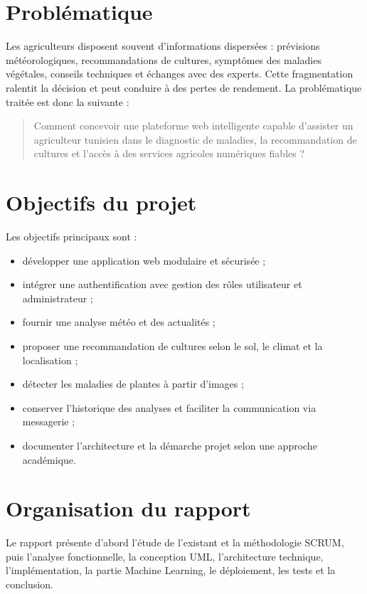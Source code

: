 \documentclass[12pt,a4paper]{report}
\begin{document}
\section{Problématique}
Les agriculteurs disposent souvent d'informations dispersées : prévisions météorologiques, recommandations de cultures, symptômes des maladies végétales, conseils techniques et échanges avec des experts. Cette fragmentation ralentit la décision et peut conduire à des pertes de rendement. La problématique traitée est donc la suivante :

\begin{quote}
Comment concevoir une plateforme web intelligente capable d'assister un agriculteur tunisien dans le diagnostic de maladies, la recommandation de cultures et l'accès à des services agricoles numériques fiables ?
\end{quote}

\section{Objectifs du projet}
Les objectifs principaux sont :
\begin{itemize}[noitemsep]
  \item développer une application web modulaire et sécurisée ;
  \item intégrer une authentification avec gestion des rôles utilisateur et administrateur ;
  \item fournir une analyse météo et des actualités ;
  \item proposer une recommandation de cultures selon le sol, le climat et la localisation ;
  \item détecter les maladies de plantes à partir d'images ;
  \item conserver l'historique des analyses et faciliter la communication via messagerie ;
  \item documenter l'architecture et la démarche projet selon une approche académique.
\end{itemize}

\section{Organisation du rapport}
Le rapport présente d'abord l'étude de l'existant et la méthodologie SCRUM, puis l'analyse fonctionnelle, la conception UML, l'architecture technique, l'implémentation, la partie Machine Learning, le déploiement, les tests et la conclusion.
\end{document}
